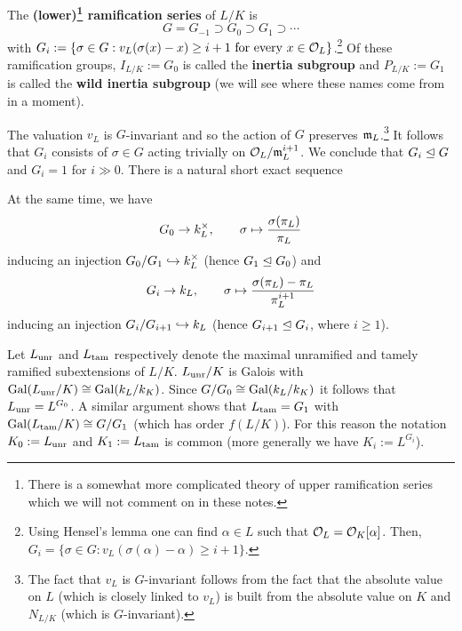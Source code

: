 \documentclass[11pt]{article}
\newcommand{\tam}{\textup{tam}} %
\begin{document}
\begin{definition}
The \textbf{(lower)\footnote{There is a somewhat more complicated theory of upper ramification series which we will not comment on in these notes.} ramification series} of $L/K$ is 
$$G=G_{-1}\supset G_0\supset G_1\supset\cdots$$
with $G_i:=\{\sigma\in G : v_L(\sigma(x)-x)\geq i+1\textrm{ for every }x\in\mathcal{O}_L\}$.\footnote{Using Hensel's lemma one can find $\alpha\in L$ such that $\mathcal{O}_L=\mathcal{O}_K[\alpha]$. Then, $G_i=\{\sigma\in G : v_L(\sigma(\alpha)-\alpha)\geq i+1\}$.} Of these ramification groups, $I_{L/K}:=G_0$ is called the \textbf{inertia subgroup} and $P_{L/K}:=G_1$ is called the \textbf{wild inertia subgroup} (we will see where these names come from in a moment).
\end{definition}

The valuation $v_L$ is $G$-invariant and so the action of $G$ preserves $\mathfrak{m}_L$.\footnote{The fact that $v_L$ is $G$-invariant follows from the fact that the absolute value on $L$ (which is closely linked to $v_L$) is built from the absolute value on $K$ and $N_{L/K}$ (which is $G$-invariant).} It follows that $G_i$ consists of $\sigma\in G$ acting trivially on $\mathcal{O}_L/\mathfrak{m}_L^{i+1}$. We conclude that $G_i\trianglelefteq G$ and $G_i=1$ for $i\gg0$. There is a natural short exact sequence
\begin{center}
\end{center}

\begin{remark}
At the same time, we have 
$$G_0\to k_L^{\times},\qquad \sigma\mapsto\dfrac{\sigma(\pi_L)}{\pi_L}$$
inducing an injection $G_0/G_1\hookrightarrow k_L^{\times}$ (hence $G_1\trianglelefteq G_0$) and 
$$G_i\to k_L,\qquad \sigma\mapsto\dfrac{\sigma(\pi_L)-\pi_L}{\pi_L^{i+1}}$$
inducing an injection $G_i/G_{i+1}\hookrightarrow k_L$ (hence $G_{i+1}\trianglelefteq G_i$, where $i\geq1$). 
\end{remark}

Let $L_{\operatorname{unr}}$ and $L_{\tam}$ respectively denote the maximal unramified and tamely ramified subextensions of $L/K$. $L_{\operatorname{unr}}/K$ is Galois with $\operatorname{Gal}(L_{\operatorname{unr}}/K)\cong\operatorname{Gal}(k_L/k_K)$. Since $G/G_0\cong\operatorname{Gal}(k_L/k_K)$ it follows that $L_{\operatorname{unr}}=L^{G_0}$. A similar argument shows that $L_{\tam}=G_1$ with $\Gal(L_{\tam}/K)\iso G/G_1$ (which has order $f(L/K)$). For this reason the notation $K_0:=L_{\operatorname{unr}}$ and $K_1:=L_{\tam}$ is common (more generally we have $K_i:=L^{G_i}$).
\end{document}
